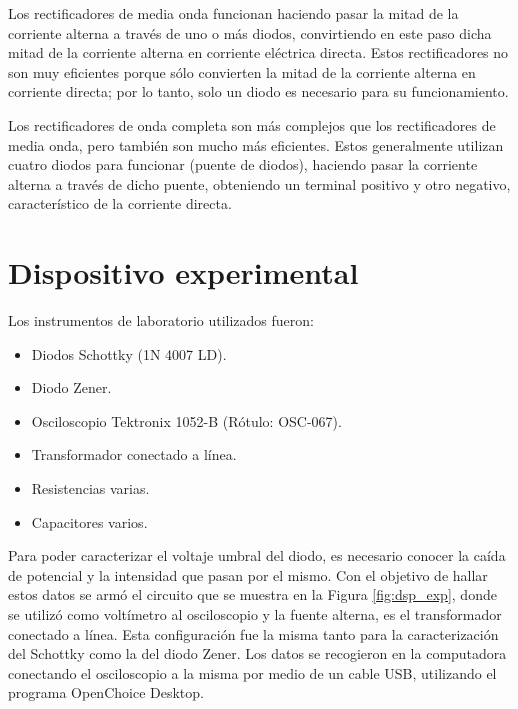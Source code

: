 \documentclass[twoside,twocolumn,a4paper]{article}
\begin{document}
Los rectificadores de media onda funcionan haciendo pasar la mitad de la corriente alterna a trav\'es de uno o m\'as diodos, convirtiendo en este paso dicha mitad de la corriente alterna en corriente el\'ectrica directa. Estos rectificadores no son muy eficientes porque s\'olo convierten la mitad de la corriente alterna en corriente directa; por lo tanto, solo un diodo es necesario para su funcionamiento.\par

Los rectificadores de onda completa son m\'as complejos que los rectificadores de media onda, pero tambi\'en son mucho m\'as eficientes. Estos generalmente utilizan cuatro diodos para funcionar (puente de diodos), haciendo pasar la corriente alterna a trav\'es de dicho puente, obteniendo un terminal positivo y otro negativo, caracter\'istico de la corriente directa.



\section{Dispositivo experimental}
Los instrumentos de laboratorio utilizados fueron:
\begin{itemize}
\item 
\label{diodo} Diodos Schottky (1N 4007 LD). %
\item 
\label{zener} Diodo Zener.
\item 
\label{osc} Osciloscopio Tektronix 1052-B (R\'otulo: OSC-067). %
\item
\label{trans} Transformador conectado a l\'inea. 
\item Resistencias varias.
\item Capacitores varios.
\end{itemize}

Para poder caracterizar el voltaje umbral del diodo, es necesario conocer la ca\'ida de potencial y la intensidad que pasan por el mismo. Con el objetivo de hallar estos datos se arm\'o el circuito que se muestra en la Figura \ref{fig:dsp_exp}, donde se utiliz\'o como volt\'imetro al osciloscopio y la fuente alterna, es el transformador conectado a l\'inea. Esta configuraci\'on fue la misma tanto para la caracterizaci\'on del Schottky como la del diodo Zener. Los datos se recogieron en la computadora conectando el osciloscopio a la misma por medio de un cable USB, utilizando el programa OpenChoice Desktop. \par 
\end{document}
